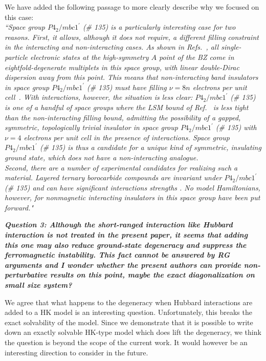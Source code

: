 \documentclass[aps,reprint,notitlepage,onecolumn,12pt]{revtex4-2}
\numberwithin{equation}{section}
\def\sg135{$P4_2/mbc1^\prime$ (\# 135)}
\begin{document}
We have added the following passage to more clearly describe why we focused on this case:\\

\textit{
``Space group $P4_2/mbc1^\prime$ (\# 135) is a particularly interesting case for two reasons.
First, it allows, although it does not require, a different filling constraint in the interacting and non-interacting cases.
As shown in Refs.~\cite{wieder2016double,bradlyn2016dirac}, all single-particle electronic states at the high-symmetry $A$ point of the BZ come in eightfold-degenerate multiplets in this space group, with linear double-Dirac dispersion away from this point. 
This means that non-interacting band insulators in space group $P4_2/mbc1^\prime$ (\# 135) must have filling $\nu=8n$ electrons per unit cell~\cite{watanabe2016fillingenforced}. 
With interactions, however, the situation is less clear: $P4_2/mbc1^\prime$ (\# 135) is one of a handful of space groups where the LSM bound of Ref.~\cite{watanabe2015filling} is less tight than the non-interacting filling bound, admitting the possibility of a gapped, symmetric, topologically trivial insulator in space group $P4_2/mbc1^\prime$ (\# 135) with $\nu=4$ electrons per unit cell in the presence of interactions. 
Space group \sg135 is thus a candidate for a unique kind of symmetric, insulating ground state, which does not have a non-interacting analogue.\\
Second, there are a number of experimental candidates for realizing such a material.
Layered ternary borocarbide compounds are invariant under \sg135 and can have significant interactions strengths \cite{wiitkarborocarbide1994}.
No model Hamiltonians, however, for nonmagnetic interacting insulators in this space group have been put forward."
}


\textbf{\textit{Question 3: Although the short-ranged interaction like Hubbard interaction is not treated in the present paper, it seems that adding this one may
also reduce ground-state degeneracy and suppress the ferromagnetic
instability.
This fact cannot be answered by RG arguments and I wonder
whether the present authors can provide non-perturbative results on
this point, maybe the exact diagonalization on small size system?}}

We agree that what happens to the degeneracy when Hubbard interactions are added to a HK model is an interesting question. Unfortunately, this breaks the exact solvability of the model. Since we demonstrate that it is possible to write down an exactly solvable HK-type model which does lift the degeneracy, we think the question is beyond the scope of the current work. It would however be an interesting direction to consider in the future.\\
\end{document}
